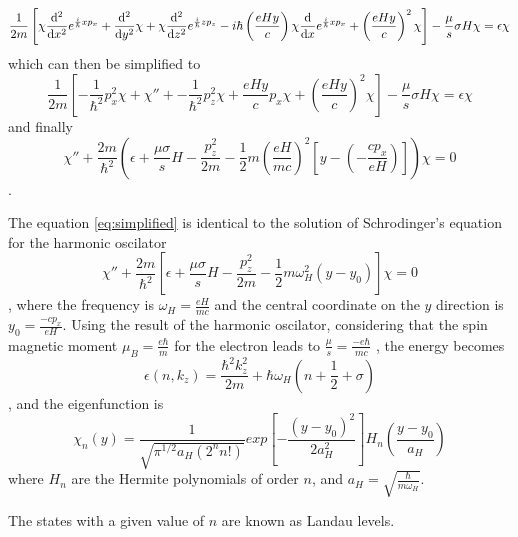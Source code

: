 \documentclass[prd,amsfonts,onecolumn,superscriptaddress,aps,nofootinbib,11pt]{revtex4}
\begin{document}
\begin{equation}
    \frac{1}{2m} \left[ \chi \dv[2]{}{x} e^{\frac{i}{\hbar}x p_x}
+ \dv[2]{}{y}\chi
+ \chi \dv[2]{}{z} e^{\frac{i}{\hbar}z p_z }
- i \hbar \left(\frac{e H y}{c}\right) \chi \dv{}{x} e^{\frac{i}{\hbar}x p_x}    + \left(\frac{e H y}{c}\right)^2\chi    \right] - \frac{\mu}{s} \sigma H \chi = \epsilon \chi
\end{equation}
which can then be simplified to
\begin{equation}
        \frac{1}{2m} \left[ -\frac{1}{\hbar^2} p_x^2 \chi
+ \chi''
+ -\frac{1}{\hbar^2} p_z^2 \chi
+  \frac{e H y}{c} p_x \chi   + \left(\frac{e H y}{c}\right)^2\chi    \right] - \frac{\mu}{s} \sigma H \chi = \epsilon \chi
\end{equation}
and finally
\begin{equation}\label{eq:simplified}
    \chi'' + \frac{2m}{\hbar^2} \left(  \epsilon + \frac{\mu \sigma}{s}H - \frac{p_z^2}{2m} - \frac{1}{2} m \left( \frac{e H}{mc}   \right)^2 \left[y - \left( - \frac{c p_x}{e H}  \right)\right]    \right) \chi = 0
\end{equation}
.


The equation \ref{eq:simplified} is identical to the solution of Schrodinger's equation for the harmonic oscilator
\begin{equation}\label{eq:oscilator}
    \chi'' + \frac{2m}{\hbar^2} \left[  \epsilon + \frac{\mu \sigma}{s}H - \frac{p_z^2}{2m} - \frac{1}{2} m \omega_H^2 \left( y - y_0\right)    \right] \chi = 0
\end{equation}
, where the frequency is $\omega_H = \frac{e H}{mc}$ and the central coordinate on the $y$ direction is $y_0 = \frac{-c p_x}{eH}$. Using the result of the harmonic oscilator, considering that the spin magnetic moment $\mu_B = \frac{e\hbar}{m}$ for the electron leads to $\frac{\mu}{s} = \frac{-e \hbar}{mc}$ , the energy becomes
\begin{equation}
    \epsilon(n, k_z) = \frac{\hbar^2 k_z^2}{2m}  + \hbar \omega_H  \left( n + \frac{1}{2} + \sigma \right)
\end{equation}
, and the eigenfunction is
\begin{equation}
    \chi_n(y) = \frac{1}{\sqrt{\pi^{1/2} a_H (2^n n!)}} exp \left[ - \frac{(y - y_0)^2}{2 a_H^2} \right] H_n\left( \frac{y - y_0}{a_H}  \right)
\end{equation}
where $H_n$ are the Hermite polynomials of order $n$, and $a_H = \sqrt{\frac{\hbar}{m \omega_H}}$. 

The states with a given value of $n$ are known as Landau levels.
\end{document}

